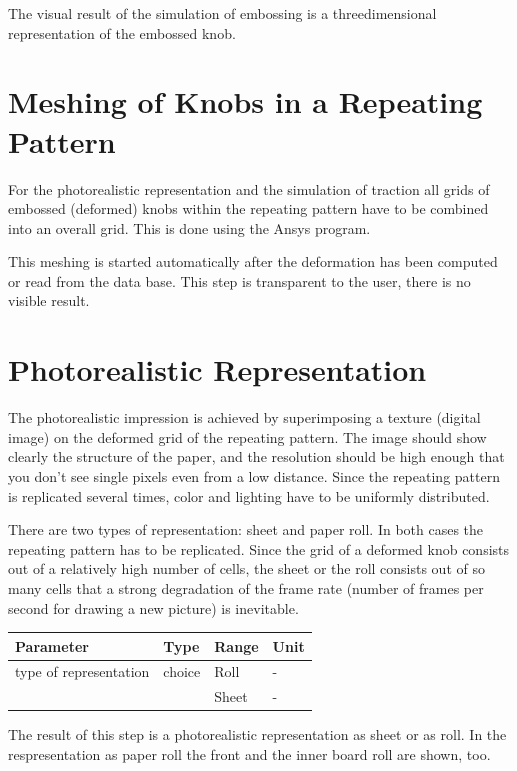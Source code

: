 The visual result of the simulation of embossing is a threedimensional 
representation of the embossed knob.


\section{Meshing of  Knobs in a Repeating Pattern}

For the photorealistic representation and the simulation of traction all 
grids of embossed (deformed) knobs within the repeating pattern have to be 
combined into an overall grid. This is done using the Ansys program.

This meshing is started automatically after the deformation has been computed 
or read from the data base. This step is transparent to the user, there is no 
visible result.  

\section{Photorealistic Representation}

The photorealistic impression is achieved by superimposing a 
texture (digital image) on the deformed grid of the repeating pattern. The 
image should show clearly the structure of the paper, and the resolution should 
be high enough that you don't see single pixels even from a low distance. 
Since the repeating pattern is replicated several times, color and lighting have 
to be uniformly distributed.

There are two types of representation: sheet and paper roll. In both cases 
the repeating pattern has to be replicated. Since the grid of a deformed knob 
consists out of  a relatively high number of cells, the sheet or the roll 
consists out of so many cells that a strong degradation of the frame 
rate (number of frames per second for drawing a new picture) is inevitable.

\vspace{0.5cm}
\begin{tabular}{|l|l|l|l|} \hline
Parameter 		& Type 		& Range 	& Unit		\\ \hline
type of representation	& choice	& Roll 		& -		\\ 
			&		& Sheet		& -		\\ \hline
\end{tabular}
\vspace{0.5cm}

The result of this step is a photorealistic representation as sheet or as roll. 
In the respresentation as paper roll the front and the inner board roll are shown, too. 


